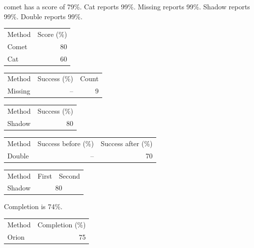 comet has a score of 79\%.
Cat reports 99\%.
Missing reports 99\%.
Shadow reports 99\%.
Double reports 99\%.
\begin{tabular}{lr}
Method & Score (\%) \\
Comet & 80 \\
Cat & 60 \\
\end{tabular}
\begin{tabular}{lrr}
Method & Success (\%) & Count \\
Missing & -- & 9 \\
\end{tabular}
\begin{tabular}{lr}
Method & Success (\%) \\
Shadow & 80 \\
\end{tabular}
\begin{tabular}{lrr}
Method & Success before (\%) & Success after (\%) \\
Double & -- & 70 \\
\end{tabular}
\begin{tabular}{lrr}
Method & First & Second \\
Shadow & \multicolumn{2}{c}{80} \\
\end{tabular}
Completion is 74\%.
\begin{tabular}{lr}
Method & Completion (\%) \\
Orion & 75 \\
\end{tabular}
\nocite{*}
